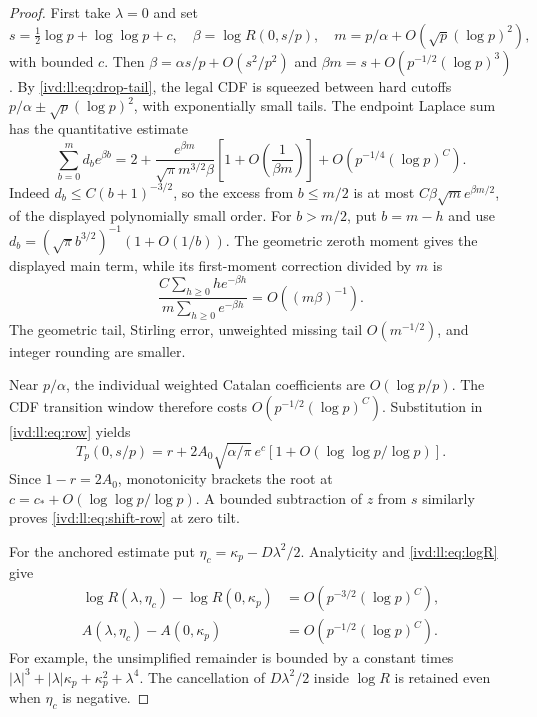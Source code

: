 \documentclass[11pt,letterpaper]{article}
\theoremstyle{remark}\newtheorem{remark}[theorem]{Remark}
\numberwithin{equation}{section}
\begin{document}
\begin{proof}
First take $\lambda=0$ and set
\[
 s=\tfrac12\log p+\log\log p+c,\quad
 \beta=\log R(0,s/p),\quad
 m=p/\alpha+O(\sqrt p(\log p)^2),
\]
with bounded $c$. Then $\beta=\alpha s/p+O(s^2/p^2)$ and
$\beta m=s+O(p^{-1/2}(\log p)^3)$. By \eqref{ivd:ll:eq:drop-tail},
the legal CDF is squeezed between hard cutoffs
$p/\alpha\pm\sqrt p(\log p)^2$, with exponentially small tails.
The endpoint Laplace sum has the quantitative estimate
\begin{equation}\label{ivd:ll:eq:laplace}
 \sum_{b=0}^m d_b e^{\beta b}
 =2+\frac{e^{\beta m}}{\sqrt\pi m^{3/2}\beta}
          \left[1+O\!\left(\frac1{\beta m}\right)\right]
            +O(p^{-1/4}(\log p)^C).
\end{equation}
Indeed $d_b\le C(b+1)^{-3/2}$, so the excess from $b\le m/2$
is at most $C\beta\sqrt m e^{\beta m/2}$, of the displayed
polynomially small order. For $b>m/2$, put $b=m-h$ and use
$d_b=(\sqrt\pi b^{3/2})^{-1}(1+O(1/b))$.
The geometric zeroth moment gives the displayed main term, while
its first-moment correction divided by $m$ is
\[
 \frac{C\sum_{h\ge0}h e^{-\beta h}}
      {m\sum_{h\ge0}e^{-\beta h}}=O((m\beta)^{-1}).
\]
The geometric tail, Stirling error, unweighted missing tail
$O(m^{-1/2})$, and integer rounding are smaller.

Near $p/\alpha$, the individual weighted Catalan coefficients are
$O(\log p/p)$. The CDF transition window therefore costs
$O(p^{-1/2}(\log p)^C)$. Substitution in \eqref{ivd:ll:eq:row} yields
\begin{equation}\label{ivd:ll:eq:scalar-row}
 T_p(0,s/p)=r+2A_0\sqrt{\alpha/\pi}\,e^c
           [1+O(\log\log p/\log p)].
\end{equation}
Since $1-r=2A_0$, monotonicity brackets the root at
$c=c_*+O(\log\log p/\log p)$. A bounded subtraction of $z$ from
$s$ similarly proves \eqref{ivd:ll:eq:shift-row} at zero tilt.

For the anchored estimate put $\eta_c=\kappa_p-D\lambda^2/2$.
Analyticity and \eqref{ivd:ll:eq:logR} give
\begin{align}
 \log R(\lambda,\eta_c)-\log R(0,\kappa_p)
                         &=O(p^{-3/2}(\log p)^C),\label{ivd:ll:eq:Rcomparison}\\
 A(\lambda,\eta_c)-A(0,\kappa_p)
                         &=O(p^{-1/2}(\log p)^C).\nonumber
\end{align}
For example, the unsimplified remainder is bounded by a constant
times $|\lambda|^3+|\lambda|\kappa_p+\kappa_p^2+\lambda^4$.
The cancellation of $D\lambda^2/2$ inside $\log R$ is retained
even when $\eta_c$ is negative.


\end{proof}
\end{document}
